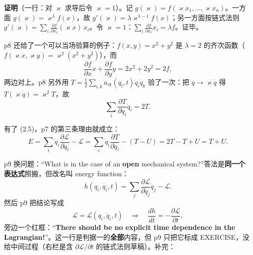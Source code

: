 \documentclass[11pt]{ctexart}
\begin{document}

\textbf{证明}（一行：对 $\varkappa$ 求导后令 $\varkappa=1$）。记 $g(\varkappa)=f(\varkappa x_1,\dots,\varkappa x_n)$。一方面 $g(\varkappa)=\varkappa^\lambda f(x)$，故 $g'(\varkappa)=\lambda\varkappa^{\lambda-1}f(x)$；另一方面按链式法则 $g'(\varkappa)=\sum_i\frac{\partial f}{\partial x_i}(\varkappa x)\,x_i$。令 $\varkappa=1$：$\sum_i\frac{\partial f}{\partial x_i}x_i=\lambda f$。证毕。

p8 还给了一个可以当场验算的例子：$f(x,y)=x^2+y^2$ 是 $\lambda=2$ 的齐次函数（$f(\varkappa x,\varkappa y)=\varkappa^2(x^2+y^2)$），而
\[
\frac{\partial f}{\partial x}x+\frac{\partial f}{\partial y}y=2x^2+2y^2=2f ,
\]
两边对上。p8 另外用 $T=\frac12\sum_{i,k}a_{ik}(q_l,t)\dot q_i\dot q_k$ 验了一次：把 $\dot q\to\varkappa\dot q$ 得 $T(\varkappa\dot q)=\varkappa^2T$，故
\[
\sum_i\frac{\partial T}{\partial\dot q_i}\dot q_i=2T . \tag{2.5}
\]


有了 (2.5)，p7 的第三条理由就成立：
\[
E=\sum_i\dot q_i\frac{\partial\mathcal{L}}{\partial\dot q_i}-\mathcal{L}
=\sum_i\dot q_i\frac{\partial T}{\partial\dot q_i}-(T-U)
=2T-T+U=T+U . \tag{2.6}
\]



p9 换问题：“What is in the case of an \textbf{open} mechanical system?”答法是\textbf{同一个表达式}照搬，但改名叫 energy function：
\[
h(q_i,\dot q_i,t)=\sum_j\frac{\partial\mathcal{L}}{\partial\dot q_j}\dot q_j-\mathcal{L}.
\]
然后 p9 把结论写成
\[
\mathcal{L}=\mathcal{L}(q_i,\dot q_i,t)\quad\Longrightarrow\quad\frac{dh}{dt}=-\frac{\partial\mathcal{L}}{\partial t},
\]
旁边一个红框：“\textbf{There should be no explicit time dependence in the Lagrangian!}”。这一行是判据一的\textbf{全部}内容，但 p9 只把它标成 EXERCISE，没给中间过程（右栏是含 $\partial\mathcal{L}/\partial t$ 的链式法则草稿）。补完：
\end{document}
